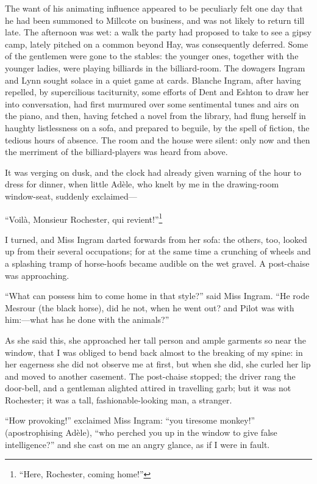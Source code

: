 The want of his animating influence appeared to be peculiarly felt one
day that he had been summoned to Millcote on business, and was not
likely to return till late. The afternoon was wet: a walk the party had
proposed to take to see a gipsy camp, lately pitched on a common beyond
Hay, was consequently deferred. Some of the gentlemen were gone to the
stables: the younger ones, together with the younger ladies, were
playing billiards in the billiard-room. The dowagers Ingram and Lynn
sought solace in a quiet game at cards. Blanche Ingram, after having
repelled, by supercilious taciturnity, some efforts of \Mrs{} Dent and
\Mrs{} Eshton to draw her into conversation, had first murmured over some
sentimental tunes and airs on the piano, and then, having fetched a
novel from the library, had flung herself in haughty listlessness on a
sofa, and prepared to beguile, by the spell of fiction, the tedious
hours of absence. The room and the house were silent: only now and then
the merriment of the billiard-players was heard from above.

It was verging on dusk, and the clock had already given warning of the
hour to dress for dinner, when little Adèle, who knelt by me in the
drawing-room window-seat, suddenly exclaimed---

\foreignquote{french}{Voilà, Monsieur Rochester, qui revient!}\footnote{
	\enquote{Here, \Mr{} Rochester, coming home!}}

I turned, and Miss Ingram darted forwards from her sofa: the others,
too, looked up from their several occupations; for at the same time a
crunching of wheels and a splashing tramp of horse-hoofs became audible
on the wet gravel. A post-chaise was approaching.

\enquote{What can possess him to come home in that style?} said Miss
Ingram. \enquote{He rode Mesrour (the black horse), did he not, when he
	went out? and Pilot was with him:---what has he done with the animals?}

As she said this, she approached her tall person and ample garments so
near the window, that I was obliged to bend back almost to the breaking
of my spine: in her eagerness she did not observe me at first, but when
she did, she curled her lip and moved to another casement. The
post-chaise stopped; the driver rang the door-bell, and a gentleman
alighted attired in travelling garb; but it was not \Mr{} Rochester; it
was a tall, fashionable-looking man, a stranger.

\enquote{How provoking!} exclaimed Miss Ingram: \enquote{you tiresome
	monkey!} (apostrophising Adèle), \enquote{who perched you up in the
	window to give false intelligence?} and she cast on me an angry glance,
as if I were in fault.

